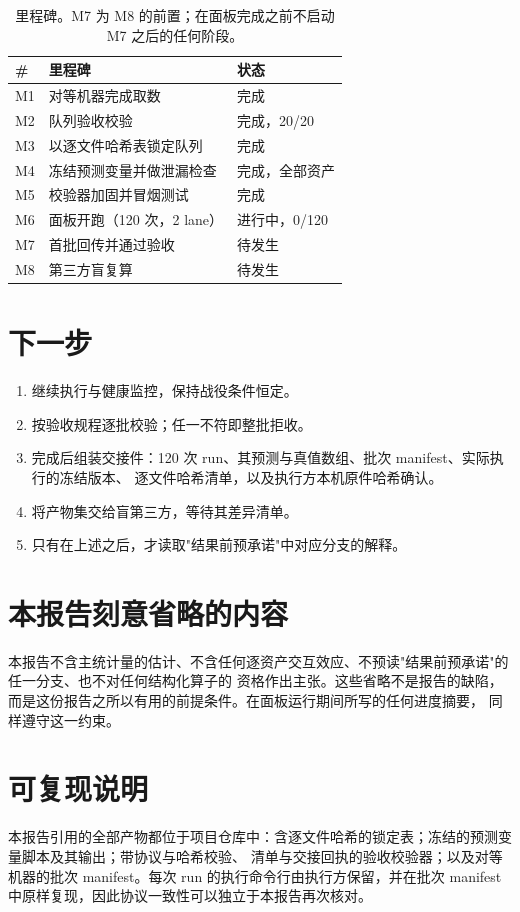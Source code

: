 \documentclass[conference]{IEEEtran}
\begin{document}
\begin{table}[!t]
\centering
\footnotesize
\setlength{\tabcolsep}{3pt}
\begin{tabular}{@{}p{}p{}p{}@{}}
\toprule
\# & 里程碑 & 状态 \\
\midrule
M1 & 对等机器完成取数 & 完成 \\
M2 & 队列验收校验 & 完成，20/20 \\
M3 & 以逐文件哈希表锁定队列 & 完成 \\
M4 & 冻结预测变量并做泄漏检查 & 完成，全部资产 \\
M5 & 校验器加固并冒烟测试 & 完成 \\
M6 & 面板开跑（120 次，2 lane） & 进行中，0/120 \\
M7 & 首批回传并通过验收 & 待发生 \\
M8 & 第三方盲复算 & 待发生 \\
\bottomrule
\end{tabular}
\caption{里程碑。M7 为 M8 的前置；在面板完成之前不启动 M7 之后的任何阶段。}
\label{tab:mil}
\end{table}

\section{下一步}
\label{sec:next}

\begin{enumerate}
\item 继续执行与健康监控，保持战役条件恒定。
\item 按验收规程逐批校验；任一不符即整批拒收。
\item 完成后组装交接件：120 次 run、其预测与真值数组、批次 manifest、实际执行的冻结版本、
逐文件哈希清单，以及执行方本机原件哈希确认。
\item 将产物集交给盲第三方，等待其差异清单。
\item 只有在上述之后，才读取"结果前预承诺"中对应分支的解释。
\end{enumerate}

\section{本报告刻意省略的内容}
\label{sec:omit}

本报告不含主统计量的估计、不含任何逐资产交互效应、不预读"结果前预承诺"的任一分支、也不对任何结构化算子的
资格作出主张。这些省略不是报告的缺陷，而是这份报告之所以有用的前提条件。在面板运行期间所写的任何进度摘要，
同样遵守这一约束。

\section*{可复现说明}

本报告引用的全部产物都位于项目仓库中：含逐文件哈希的锁定表；冻结的预测变量脚本及其输出；带协议与哈希校验、
清单与交接回执的验收校验器；以及对等机器的批次 manifest。每次 run 的执行命令行由执行方保留，并在批次 manifest
中原样复现，因此协议一致性可以独立于本报告再次核对。
\end{document}
